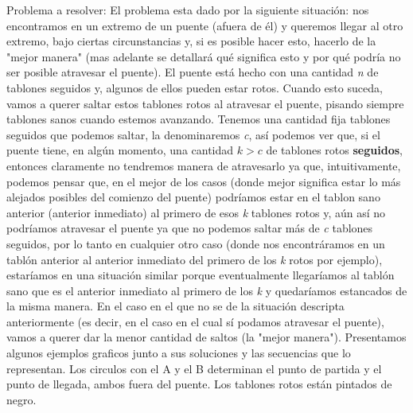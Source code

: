 \documentclass{article}
\begin{document}
{\noindent \Huge Problema a resolver:}
\newline \newline  El problema esta dado por la siguiente situaci\'on: nos encontramos en un extremo de un puente (afuera de \'el) y queremos llegar al otro extremo, bajo ciertas circunstancias y, si es posible hacer esto, hacerlo de la "mejor manera" (mas adelante se detallar\'a qu\'e significa esto y por qu\'e podr\'ia no ser posible atravesar el puente). El puente est\'a hecho con una cantidad \textit{n} de tablones seguidos y, algunos de ellos pueden estar rotos. Cuando esto suceda, vamos a querer saltar estos tablones rotos al atravesar el puente, pisando siempre tablones sanos cuando estemos avanzando.\newline
Tenemos una cantidad fija tablones seguidos que podemos saltar, la denominaremos \textit{c}, as\'i podemos ver que, si el puente tiene, en alg\'un momento, una cantidad \textit{$k > c$} de tablones rotos \textbf{seguidos}, entonces claramente no tendremos manera de atravesarlo ya que, intuitivamente, podemos pensar que, en el mejor de los casos (donde mejor significa estar lo m\'as alejados posibles del comienzo del puente) podr\'iamos estar en el tablon sano anterior (anterior inmediato) al primero de esos \textit{k} tablones rotos y, a\'un as\'i no podr\'iamos atravesar el puente ya que no podemos saltar m\'as de \textit{c} tablones seguidos, por lo tanto en cualquier otro caso (donde nos encontr\'aramos en un tabl\'on anterior al anterior inmediato del primero de los \textit{k} rotos por ejemplo), estar\'iamos en una situaci\'on similar porque eventualmente llegar\'iamos al tabl\'on sano que es el anterior inmediato al primero de los \textit{k} y quedar\'iamos estancados de la misma manera.
\newline En el caso en el que no se de la situaci\'on descripta anteriormente (es decir, en el caso en el cual s\'i podamos atravesar el puente), vamos a querer dar la menor cantidad de saltos (la "mejor manera").
\newline \newline Presentamos algunos ejemplos graficos junto a sus soluciones y las secuencias que lo representan. Los circulos con el A y el B determinan el punto de partida y el punto de llegada, ambos fuera del puente. Los tablones rotos est\'an pintados de negro.
\end{document}

